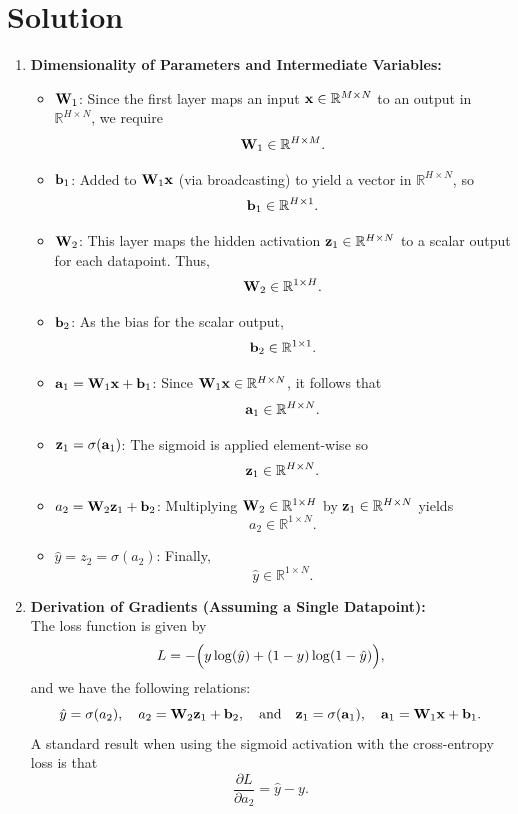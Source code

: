 \documentclass[submit]{../harvardml}
\newenvironment{answer}
  {\section*{Solution}}
{}
\begin{document}
\begin{answer}
  \begin{enumerate}
    \item \textbf{Dimensionality of Parameters and Intermediate Variables:}
          \begin{itemize}
            \item $\bold{W}_1$: Since the first layer maps an input $\bold{x}\in\mathbb{R}^{M\times N}$ to an output in $\mathbb{R}^{H\times N}$, we require
                  \[
                  \bold{W}_1\in\mathbb{R}^{H\times M}.
                  \]
            \item $\bold{b}_1$: Added to $\bold{W}_1\bold{x}$ (via broadcasting) to yield a vector in $\mathbb{R}^{H\times N}$, so
                  \[
                  \bold{b}_1\in\mathbb{R}^{H\times 1}.
                  \]
            \item $\bold{W}_2$: This layer maps the hidden activation $\bold{z}_1\in\mathbb{R}^{H\times N}$ to a scalar output for each datapoint. Thus,
                  \[
                  \bold{W}_2\in\mathbb{R}^{1\times H}.
                  \]
            \item $\bold{b}_2$: As the bias for the scalar output,
                  \[
                  \bold{b}_2\in\mathbb{R}^{1\times 1}.
                  \]
            \item $\bold{a}_1 = \bold{W}_1\bold{x} + \bold{b}_1$: Since $\bold{W}_1\bold{x}\in\mathbb{R}^{H\times N}$, it follows that
                  \[
                  \bold{a}_1\in\mathbb{R}^{H\times N}.
                  \]
            \item $\bold{z}_1 = \sigma(\bold{a}_1)$: The sigmoid is applied element-wise so
                  \[
                  \bold{z}_1\in\mathbb{R}^{H\times N}.
                  \]
            \item $a_2 = \bold{W}_2\bold{z}_1 + \bold{b}_2$: Multiplying $\bold{W}_2\in\mathbb{R}^{1\times H}$ by $\bold{z}_1\in\mathbb{R}^{H\times N}$ yields
                  \[
                  a_2\in\mathbb{R}^{1\times N}.
                  \]
            \item $\hat{y} = z_2 = \sigma(a_2)$: Finally,
                  \[
                  \hat{y}\in\mathbb{R}^{1\times N}.
                  \]
          \end{itemize}

    \item \textbf{Derivation of Gradients (Assuming a Single Datapoint):}\\[1mm]
          The loss function is given by
          \[
          L = -\Bigl(y\log (\hat{y}) + (1-y)\log (1-\hat{y})\Bigr),
          \]
          and we have the following relations:
          \[
          \hat{y} = \sigma(a_2), \quad a_2 = \bold{W}_2\bold{z}_1 + \bold{b}_2, \quad \text{and} \quad \bold{z}_1 = \sigma(\bold{a}_1), \quad \bold{a}_1 = \bold{W}_1\bold{x} + \bold{b}_1.
          \]
          A standard result when using the sigmoid activation with the cross-entropy loss is that
          \[
          \frac{\partial L}{\partial a_2} = \hat{y}-y.
          \]


\end{enumerate}
\end{answer}
\end{document}
